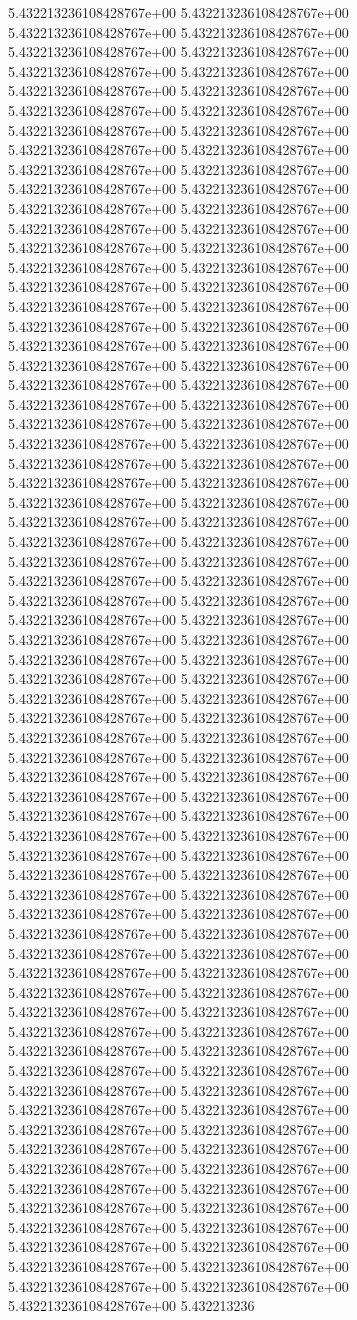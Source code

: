 5.432213236108428767e+00	5.432213236108428767e+00	5.432213236108428767e+00	5.432213236108428767e+00	5.432213236108428767e+00	5.432213236108428767e+00	5.432213236108428767e+00	5.432213236108428767e+00	5.432213236108428767e+00	5.432213236108428767e+00	5.432213236108428767e+00	5.432213236108428767e+00	5.432213236108428767e+00	5.432213236108428767e+00	5.432213236108428767e+00	5.432213236108428767e+00	5.432213236108428767e+00	5.432213236108428767e+00	5.432213236108428767e+00	5.432213236108428767e+00	5.432213236108428767e+00	5.432213236108428767e+00	5.432213236108428767e+00	5.432213236108428767e+00	5.432213236108428767e+00	5.432213236108428767e+00	5.432213236108428767e+00	5.432213236108428767e+00	5.432213236108428767e+00	5.432213236108428767e+00	5.432213236108428767e+00	5.432213236108428767e+00	5.432213236108428767e+00	5.432213236108428767e+00	5.432213236108428767e+00	5.432213236108428767e+00	5.432213236108428767e+00	5.432213236108428767e+00	5.432213236108428767e+00	5.432213236108428767e+00	5.432213236108428767e+00	5.432213236108428767e+00	5.432213236108428767e+00	5.432213236108428767e+00	5.432213236108428767e+00	5.432213236108428767e+00	5.432213236108428767e+00	5.432213236108428767e+00	5.432213236108428767e+00	5.432213236108428767e+00	5.432213236108428767e+00	5.432213236108428767e+00	5.432213236108428767e+00	5.432213236108428767e+00	5.432213236108428767e+00	5.432213236108428767e+00	5.432213236108428767e+00	5.432213236108428767e+00	5.432213236108428767e+00	5.432213236108428767e+00	5.432213236108428767e+00	5.432213236108428767e+00	5.432213236108428767e+00	5.432213236108428767e+00	5.432213236108428767e+00	5.432213236108428767e+00	5.432213236108428767e+00	5.432213236108428767e+00	5.432213236108428767e+00	5.432213236108428767e+00	5.432213236108428767e+00	5.432213236108428767e+00	5.432213236108428767e+00	5.432213236108428767e+00	5.432213236108428767e+00	5.432213236108428767e+00	5.432213236108428767e+00	5.432213236108428767e+00	5.432213236108428767e+00	5.432213236108428767e+00	5.432213236108428767e+00	5.432213236108428767e+00	5.432213236108428767e+00	5.432213236108428767e+00	5.432213236108428767e+00	5.432213236108428767e+00	5.432213236108428767e+00	5.432213236108428767e+00	5.432213236108428767e+00	5.432213236108428767e+00	5.432213236108428767e+00	5.432213236108428767e+00	5.432213236108428767e+00	5.432213236108428767e+00	5.432213236108428767e+00	5.432213236108428767e+00	5.432213236108428767e+00	5.432213236108428767e+00	5.432213236108428767e+00	5.432213236108428767e+00	5.432213236108428767e+00	5.432213236108428767e+00	5.432213236108428767e+00	5.432213236108428767e+00	5.432213236108428767e+00	5.432213236108428767e+00	5.432213236108428767e+00	5.432213236108428767e+00	5.432213236108428767e+00	5.432213236108428767e+00	5.432213236108428767e+00	5.432213236108428767e+00	5.432213236108428767e+00	5.432213236108428767e+00	5.432213236108428767e+00	5.432213236108428767e+00	5.432213236108428767e+00	5.432213236108428767e+00	5.432213236108428767e+00	5.432213236108428767e+00	5.432213236108428767e+00	5.432213236108428767e+00	5.432213236108428767e+00	5.432213236108428767e+00	5.432213236108428767e+00	5.432213236108428767e+00	5.432213236108428767e+00	5.432213236108428767e+00	5.432213236108428767e+00	5.432213236108428767e+00	5.432213236108428767e+00	5.432213236108428767e+00	5.432213236108428767e+00	5.432213236